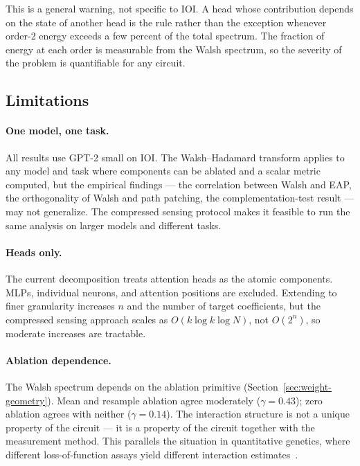 This is a general warning, not specific to IOI. A head whose
contribution depends on the state of another head is the rule rather
than the exception whenever order-2 energy exceeds a few percent of
the total spectrum. The fraction of energy at each order is measurable
from the Walsh spectrum, so the severity of the problem is quantifiable
for any circuit.

\subsection{Limitations}

\paragraph{One model, one task.}

All results use GPT-2 small on IOI. The Walsh--Hadamard transform
applies to any model and task where components can be ablated and a
scalar metric computed, but the empirical findings --- the correlation
between Walsh and EAP, the orthogonality of Walsh and path patching,
the complementation-test result --- may not generalize. The compressed
sensing protocol makes it feasible to run the same analysis on larger
models and different tasks.

\paragraph{Heads only.}

The current decomposition treats attention heads as the atomic
components. MLPs, individual neurons, and attention positions are
excluded. Extending to finer granularity increases $n$ and the number
of target coefficients, but the compressed sensing approach scales
as $O(k \log k \log N)$, not $O(2^n)$, so moderate increases are
tractable.

\paragraph{Ablation dependence.}

The Walsh spectrum depends on the ablation primitive
(Section~\ref{sec:weight-geometry}). Mean and resample ablation agree
moderately ($\gamma = 0.43$); zero ablation agrees with neither
($\gamma = 0.14$). The interaction structure is not a unique property
of the circuit --- it is a property of the circuit together with the
measurement method. This parallels the situation in quantitative
genetics, where different loss-of-function assays yield different
interaction
estimates~\citep{housden2017comparison,fluidity2024elife}.

